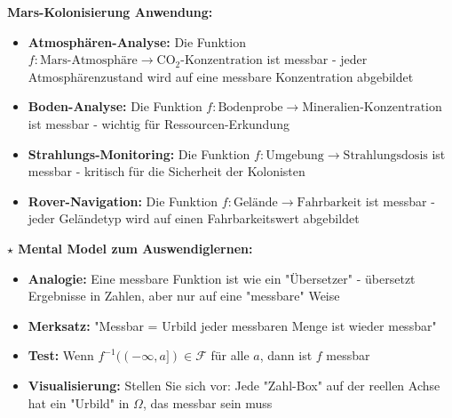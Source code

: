 \begin{denoobification}
\textbf{Mars-Kolonisierung Anwendung:}
\begin{itemize}
    \item \textbf{Atmosphären-Analyse:} Die Funktion $f: \text{Mars-Atmosphäre} \to \text{CO}_2\text{-Konzentration}$ ist messbar - jeder Atmosphärenzustand wird auf eine messbare Konzentration abgebildet
    \item \textbf{Boden-Analyse:} Die Funktion $f: \text{Bodenprobe} \to \text{Mineralien-Konzentration}$ ist messbar - wichtig für Ressourcen-Erkundung
    \item \textbf{Strahlungs-Monitoring:} Die Funktion $f: \text{Umgebung} \to \text{Strahlungsdosis}$ ist messbar - kritisch für die Sicherheit der Kolonisten
    \item \textbf{Rover-Navigation:} Die Funktion $f: \text{Gelände} \to \text{Fahrbarkeit}$ ist messbar - jeder Geländetyp wird auf einen Fahrbarkeitswert abgebildet
\end{itemize}

\textbf{$\star$ Mental Model zum Auswendiglernen:}
\begin{itemize}
    \item \textbf{Analogie:} Eine messbare Funktion ist wie ein "Übersetzer" - übersetzt Ergebnisse in Zahlen, aber nur auf eine "messbare" Weise
    \item \textbf{Merksatz:} "Messbar = Urbild jeder messbaren Menge ist wieder messbar"
    \item \textbf{Test:} Wenn $f^{-1}((-\infty, a]) \in \mathcal{F}$ für alle $a$, dann ist $f$ messbar
    \item \textbf{Visualisierung:} Stellen Sie sich vor: Jede "Zahl-Box" auf der reellen Achse hat ein "Urbild" in $\Omega$, das messbar sein muss
\end{itemize}

\begin{center}
\end{center}
\end{denoobification}
